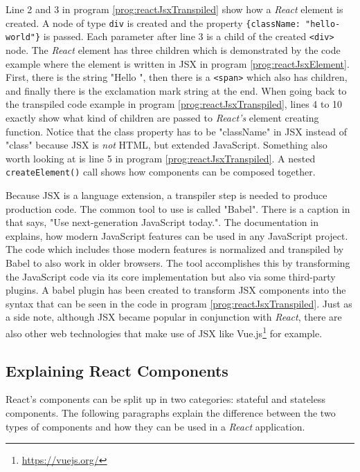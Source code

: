 Line 2 and 3 in program \ref{prog:reactJsxTranspiled} show how a \emph{React} element is created. A node of type \texttt{div} is created and the property \texttt{\{className: "hello-world"\}} is passed. Each parameter after line 3 is a child of the created \texttt{<div>} node. The \emph{React} element has three children which is demonstrated by the code example where the element is written in JSX in program \ref{prog:reactJsxElement}. First, there is the string "Hello ", then there is a \texttt{<span>} which also has children, and finally there is the exclamation mark string at the end. When going back to the transpiled code example in program \ref{prog:reactJsxTranspiled}, lines 4 to 10 exactly show what kind of children are passed to \emph{React's} element creating function. Notice that the class property has to be "className" in JSX instead of "class" because JSX is \emph{not} HTML, but extended JavaScript. Something also worth looking at is line 5 in program \ref{prog:reactJsxTranspiled}. A nested \texttt{createElement()} call shows how components can be composed together.

Because JSX is a language extension, a transpiler step is needed to produce production code. The common tool to use is called "Babel". There is a caption in \cite{Babel} that says, "Use next-generation JavaScript today.". The documentation in \cite{Babel} explains, how modern JavaScript features can be used in any JavaScript project. The code which includes those modern features is normalized and transpiled by Babel to also work in older browsers. The tool accomplishes this by transforming the JavaScript code via its core implementation but also via some third-party plugins. A babel plugin has been created to transform JSX components into the syntax that can be seen in the code in program \ref{prog:reactJsxTranspiled}. Just as a side note, although JSX became popular in conjunction with \emph{React}, there are also other web technologies that make use of JSX like Vue.js\footnote{\url{https://vuejs.org/}} for example.

\subsection{Explaining React Components}
\label{sec:reactComponents}

React's components can be split up in two categories: stateful and stateless components. The following paragraphs explain the difference between the two types of components and how they can be used in a \emph{React} application.

